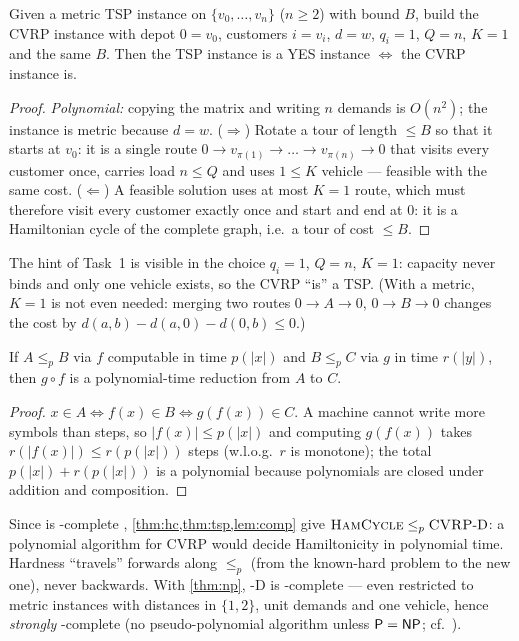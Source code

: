 \begin{theorem}\label{thm:tsp}
Given a metric TSP instance on $\{v_0,\dots,v_n\}$ ($n\ge 2$) with bound $B$, build the CVRP
instance with depot $0=v_0$, customers $i=v_i$, $d=w$, $q_i=1$, $Q=n$, $K=1$ and the same $B$.
Then the TSP instance is a YES instance $\iff$ the CVRP instance is.
\end{theorem}
\begin{proof}
\emph{Polynomial:} copying the matrix and writing $n$ demands is $O(n^2)$; the instance is metric
because $d=w$. ($\Rightarrow$) Rotate a tour of length $\le B$ so that it starts at $v_0$: it is a single
route $0\to v_{\pi(1)}\to\dots\to v_{\pi(n)}\to0$ that visits every customer once, carries load
$n\le Q$ and uses $1\le K$ vehicle --- feasible with the same cost. ($\Leftarrow$) A feasible solution
uses at most $K=1$ route, which must therefore visit every customer exactly once and start and end at $0$:
it is a Hamiltonian cycle of the complete graph, i.e.\ a tour of cost $\le B$.
\end{proof}
The hint of Task~1 is visible in the choice $q_i=1$, $Q=n$, $K=1$: capacity never binds and only one
vehicle exists, so the CVRP ``is'' a TSP. (With a metric, $K=1$ is not even needed: merging two routes
$0\!\to\!A\!\to\!0$, $0\!\to\!B\!\to\!0$ changes the cost by $d(a,b)-d(a,0)-d(0,b)\le 0$.)

\begin{lemma}[composition]\label{lem:comp}
If $A\le_p B$ via $f$ computable in time $p(|x|)$ and $B\le_p C$ via $g$ in time $r(|y|)$,
then $g\circ f$ is a polynomial-time reduction from $A$ to $C$.
\end{lemma}
\begin{proof}
$x\in A\iff f(x)\in B\iff g(f(x))\in C$. A machine cannot write more symbols than steps, so
$|f(x)|\le p(|x|)$ and computing $g(f(x))$ takes $r(|f(x)|)\le r(p(|x|))$ steps (w.l.o.g.\ $r$ is
monotone); the total $p(|x|)+r(p(|x|))$ is a polynomial because polynomials are closed under
addition and composition.
\end{proof}
Since \hc{} is \NP-complete \citep{karp1972reducibility}, \cref{thm:hc,thm:tsp,lem:comp} give
$\textsc{HamCycle}\le_p\textsc{CVRP}\text{-D}$: a polynomial algorithm for CVRP would decide Hamiltonicity in polynomial
time. Hardness ``travels'' forwards along $\le_p$ (from the known-hard problem to the new one), never backwards.
With \cref{thm:np}, \cvrp-D is \NP-complete --- even restricted to metric instances with
distances in $\{1,2\}$, unit demands and one vehicle, hence \emph{strongly} \NP-complete (no
pseudo-polynomial algorithm unless $\textsf{P}=\textsf{NP}$; cf.\ \citep{lenstra1981complexity}).

